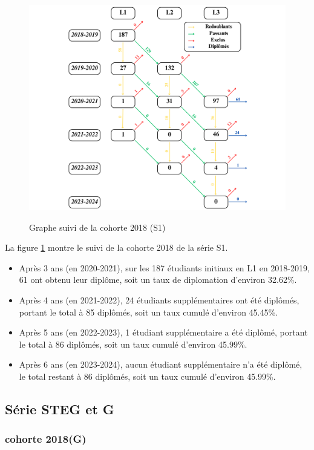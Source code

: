 \begin{figure}[ht]
    \centering
    \caption{Graphe suivi de la cohorte 2018 (S1)}
    \includegraphics[width=1\textwidth]{figure/S1_2018.png}
    \label{fig:cohorte_s1_2018}
\end{figure}

La figure \ref{fig:cohorte_s1_2018} montre le suivi de la cohorte 2018 de la série S1.
\begin{itemize}
    \item Après 3 ans (en 2020-2021), sur les 187 étudiants initiaux en L1 en 2018-2019, 61 ont obtenu leur diplôme, soit un taux de diplomation d'environ 32.62\%.
    \item Après 4 ans (en 2021-2022), 24 étudiants supplémentaires ont été diplômés, portant le total à 85 diplômés, soit un taux cumulé d'environ 45.45\%.
    \item Après 5 ans (en 2022-2023), 1 étudiant supplémentaire a été diplômé, portant le total à 86 diplômés, soit un taux cumulé d'environ 45.99\%.
    \item Après 6 ans (en 2023-2024), aucun étudiant supplémentaire n'a été diplômé, le total restant à 86 diplômés, soit un taux cumulé d'environ 45.99\%.
\end{itemize}

\newpage
\subsection{Série STEG et G}

\subsubsection{cohorte 2018(G)}

